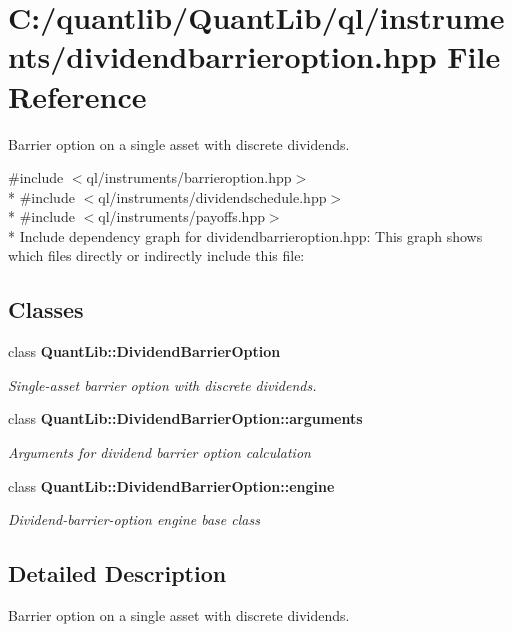 \section{C\+:/quantlib/\+Quant\+Lib/ql/instruments/dividendbarrieroption.hpp File Reference}
\label{dividendbarrieroption_8hpp}


Barrier option on a single asset with discrete dividends.  


{\ttfamily \#include $<$ql/instruments/barrieroption.\+hpp$>$}\\*
{\ttfamily \#include $<$ql/instruments/dividendschedule.\+hpp$>$}\\*
{\ttfamily \#include $<$ql/instruments/payoffs.\+hpp$>$}\\*
Include dependency graph for dividendbarrieroption.\+hpp\+:
This graph shows which files directly or indirectly include this file\+:
\subsection*{Classes}
\begin{DoxyCompactItemize}
\item 
class {\bf Quant\+Lib\+::\+Dividend\+Barrier\+Option}
\begin{DoxyCompactList}\small\item\em Single-\/asset barrier option with discrete dividends. \end{DoxyCompactList}\item 
class {\bf Quant\+Lib\+::\+Dividend\+Barrier\+Option\+::arguments}
\begin{DoxyCompactList}\small\item\em Arguments for dividend barrier option calculation \end{DoxyCompactList}\item 
class {\bf Quant\+Lib\+::\+Dividend\+Barrier\+Option\+::engine}
\begin{DoxyCompactList}\small\item\em Dividend-\/barrier-\/option engine base class \end{DoxyCompactList}\end{DoxyCompactItemize}


\subsection{Detailed Description}
Barrier option on a single asset with discrete dividends. 


